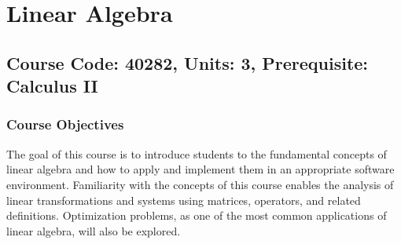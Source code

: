 \documentclass[12pt]{article}
\begin{document}
\section{Linear Algebra}
\subsection*{Course Code: 40282, Units: 3, Prerequisite: Calculus II}

\subsubsection*{Course Objectives}
The goal of this course is to introduce students to the fundamental concepts of linear algebra and how to apply and implement them in an appropriate software environment. Familiarity with the concepts of this course enables the analysis of linear transformations and systems using matrices, operators, and related definitions. Optimization problems, as one of the most common applications of linear algebra, will also be explored.
\end{document}
